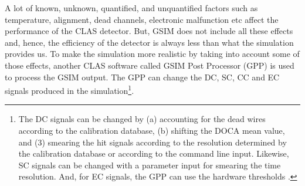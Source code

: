 
\hspace{0.5cm}

A lot of known, unknown, quantified, and unquantified factors such as temperature, alignment, dead channels, electronic malfunction etc affect the performance of the CLAS detector. But, GSIM does not include all these effects and, hence, the efficiency of the detector is always less than what the simulation provides us. To make the simulation more realistic by taking into account some of those effects, another CLAS software called GSIM Post Processor (GPP) is used to process the GSIM output. The GPP can change the DC, SC, CC and EC signals produced in the simulation\footnote{The DC signals can be changed by (a) accounting for the dead wires according to the calibration database, (b) shifting the DOCA mean value, and (3) smearing the hit signals according to the resolution determined by the calibration database or according to the command line input. Likewise, SC signals can be changed with a parameter input for smearing the time resolution. And, for %
EC signals, the GPP can use the hardware thresholds \cite{jxZhang_th}.}.

